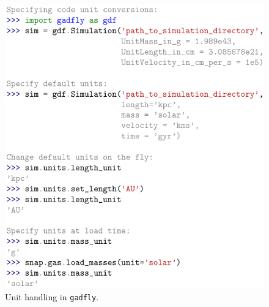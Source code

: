 \documentclass{thesis}
\newcommand{\code}[1]{\texttt{#1}}
\begin{document}
\begin{figure}
\begin{center}
\includegraphics[width=\columnwidth]{figures/code_units/code_units}
\caption{\label{fig:units}
Unit handling in \code{gadfly}.%
}
\end{center}
\end{figure}
\end{document}
